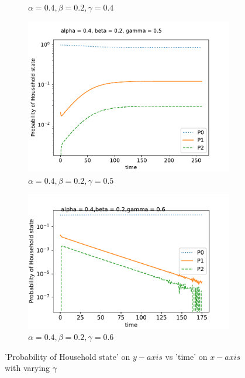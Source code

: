\documentclass[paper=a4, fontsize=11pt, twoside, BCOR=12mm, parskip=full, listof=totoc]{scrreprt}
\begin{document}
{\begin{figure}[H]
\begin{subfigure}[b]{0.4\linewidth}
	  \caption{\(\alpha=0.4, \beta=0.2, \gamma=0.4\)}
	  \label{gamma four}
	\end{subfigure}
	\begin{subfigure}[b]{0.4\linewidth}
	  \includegraphics[width=\linewidth]{sim/033_a2_5.pdf}
	  \caption{\(\alpha=0.4, \beta=0.2, \gamma=0.5\)}
	  \label{gamma five}
	\end{subfigure}
	\begin{subfigure}[b]{0.4\linewidth}
	  \includegraphics[width=\linewidth]{sim/043_a3.pdf}
	  \caption{\(\alpha=0.4, \beta=0.2, \gamma=0.6\)}
	  \label{gamma six}
	\end{subfigure}
	\caption{'Probability of Household state' on $y-axis$ vs 'time' on $x-axis$ with varying $\gamma$}
	\label{fig changing gamma values}
\end{figure}

}
\end{document}
